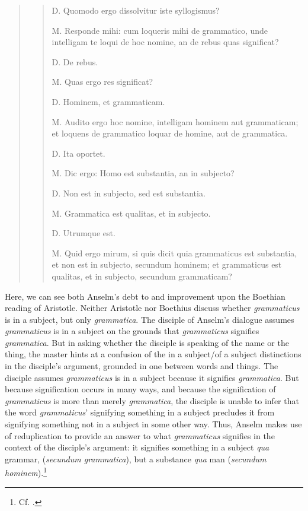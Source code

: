\documentclass[]{article}
\begin{document}
\begin{quote}
{\begin{quote}
D. Quomodo ergo dissolvitur iste syllogismus? 

M. Responde mihi: cum loqueris mihi de grammatico, unde intelligam te loqui de hoc nomine, an de rebus quas significat? 

D. De rebus. 

M. Quas ergo res significat? 

D. Hominem, et grammaticam. 

M. Audito ergo hoc nomine, intelligam hominem aut grammaticam; et loquens de grammatico loquar de homine, aut de grammatica. 

D. Ita oportet. 

M. Dic ergo: Homo est substantia, an in subjecto? 

D. Non est in subjecto, sed est substantia. 

M. Grammatica est qualitas, et in subjecto. 

D. Utrumque est. 

M. Quid ergo mirum, si quis dicit quia grammaticus est substantia, et non est in subjecto, secundum hominem; et grammaticus est qualitas, et in subjecto, secundum grammaticam?
\end{quote}}
\end{quote}

Here, we can see both Anselm's debt to and improvement upon the Boethian reading of Aristotle. Neither Aristotle nor Boethius discuss whether \textit{grammaticus} is in a subject, but only \textit{grammatica}. The disciple of Anselm's dialogue assumes \textit{grammaticus} is in a subject on the grounds that \textit{grammaticus} signifies \textit{grammatica}. But in asking whether the disciple is speaking of the name or the thing, the master hints at a confusion of the in a subject/of a subject distinctions in the disciple's argument, grounded in one between words and things. The disciple assumes \textit{grammaticus} is in a subject because it signifies \textit{grammatica}. But because signification occurs in many ways, and because the signification of \textit{grammaticus} is more than merely \textit{grammatica}, the disciple is unable to infer that the word \textit{grammaticus}' signifying something in a subject precludes it from signifying something not in a subject in some other way. Thus, Anselm makes use of reduplication to provide an answer to what \textit{grammaticus} signifies in the context of the disciple's argument: it signifies something in a subject \textit{qua} grammar, (\textit{secundum grammatica}), but a substance \textit{qua} man (\textit{secundum hominem}).\footnote{Cf. \cite[pp. 110-116]{Back1996}.}
\end{document}
